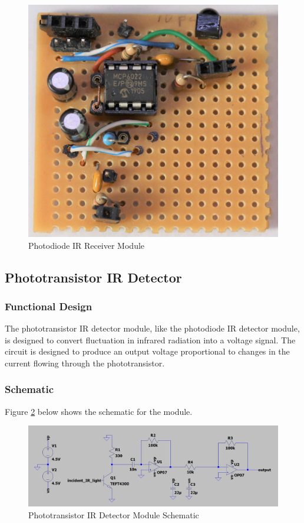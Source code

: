 \begin{figure}[H]
	\centering
	\includegraphics[width=.6\textwidth]{figures/modules/photodiode_receiver.jpg}
	\caption{Photodiode IR Receiver Module}
	\label{fig:module_photodiode_receiver}
\end{figure}





\subsection{Phototransistor IR Detector}

\subsubsection{Functional Design}
The phototransistor IR detector module, like the photodiode IR detector module, is designed to convert fluctuation in infrared radiation into a voltage signal. The circuit is designed to produce an output voltage proportional to changes in the current flowing through the phototransistor.

\subsubsection{Schematic}
Figure \ref{fig:schematic_phototransistor_detector} below shows the schematic for the module.


\begin{figure}[H]
	\centering
	\includegraphics[width=.9\textwidth]{figures/design/phototransistor_detector.JPG}
	\caption{Phototransistor IR Detector Module Schematic}
	\label{fig:schematic_phototransistor_detector}
\end{figure}

